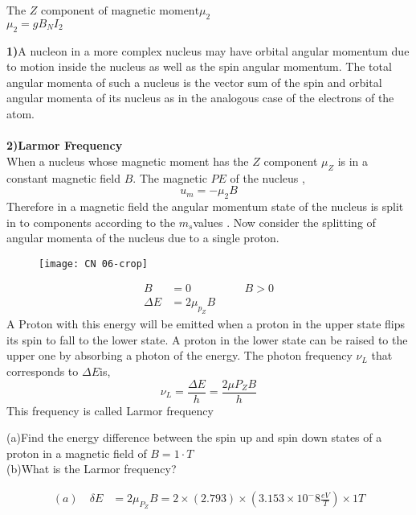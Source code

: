 \begin{enumerate}
\begin{enumerate}
$\text{The $Z$ component of magnetic moment}\mu_2$\\
$\mu_{2}=g B_{N} I_{2}$
\end{enumerate}
\begin{note}	
 \textbf{1)}\quad A nucleon in a more complex nucleus may have orbital angular momentum  due to motion inside the nucleus as well as the spin angular momentum. The total angular momenta of such a nucleus is the vector sum of the spin and orbital angular momenta of its nucleus as in the analogous case of the electrons of the atom.\\\\
 	\textbf{2)}\quad \textbf{Larmor Frequency}\\
 	When a nucleus whose magnetic moment has the $Z$ component $\mu_{Z}$ is in a constant magnetic field $B$. The magnetic $PE$ of the nucleus ,\\
 	$$u_{m}=-\mu_{2} B$$
 	Therefore in a magnetic field the angular momentum state of the nucleus is split in to components according to the $m_s$values . Now consider the splitting of angular momenta of the nucleus due to a single proton.\\
 	\begin{figure}[H]
 		\centering
 		\texttt{[image: CN 06-crop]}
 		\caption{}
 		\label{}
 	\end{figure}
 	\begin{align*}
 	B&=0\hspace{2cm} B>0\\
 	\Delta E&=2 \mu_{p_{Z}} B
 	\end{align*}
 	A Proton with this energy will be emitted when a proton in the upper state flips its spin to fall to the lower state. A proton in the lower state can be raised to the upper one by absorbing a photon of the energy. The photon frequency $\nu_L$ that corresponds to $\Delta E$is,\\
 	$$\nu_{L}=\frac{\Delta E}{h}=\frac{2 \mu P_{Z} B}{h}$$
 	This frequency is called Larmor frequency
\end{note}
\begin{exercise}
	 (a)\quad Find the energy difference between the spin up and spin down states of a proton in a magnetic field of $B=1\cdot T$ \\
	(b)\quad What is the Larmor frequency?
\end{exercise}
\begin{answer}
	\begin{align*}
	(a)\quad
	\delta E&=2\mu_{P_{Z}}B=2\times(2.793)\times \left(3.153\times10^-8\frac{eV}{T} \right) \times1T\\

\end{align*}
\end{answer}
\end{enumerate}
